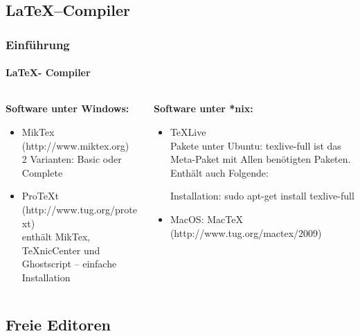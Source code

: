 \subsection{\LaTeX --Compiler}
\begin{frame}
\frametitle{Einf\"uhrung}
\framesubtitle{\LaTeX - Compiler}
\begin{columns}[t]
\begin{column}{.4\textwidth}
\textbf{Software unter Windows:}\\
\begin{itemize}
  \item MikTex (http://www.miktex.org)\\
   2 Varianten: Basic oder  Complete
  \item ProTeXt (http://www.tug.org/protext)\\
enthält MikTex, TeXnicCenter und Ghostscript – einfache Installation\\
\end{itemize}
\end{column}
\begin{column}{.6\textwidth}
\textbf{Software unter *nix:}
\begin{itemize}
  \item TeXLive\\
Pakete unter Ubuntu: {\ttfamily texlive-full} ist das Meta-Paket mit Allen
ben\"otigten Paketen. Enthält auch Folgende:
Installation: {\ttfamily sudo apt-get install texlive-full}
\item MacOS: MacTeX (http://www.tug.org/mactex/2009)\\
\end{itemize}
\end{column}
\end{columns}
\end{frame}


\subsection{Freie Editoren}


